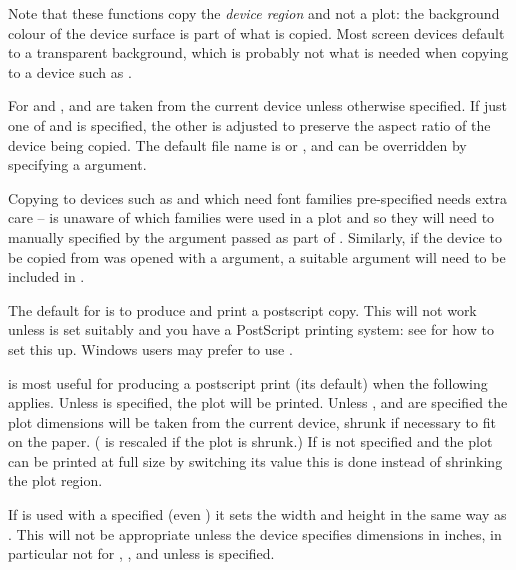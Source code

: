 \begin{Details}\relax
Note that these functions copy the \emph{device region} and not a
plot: the background colour of the device surface is part of what is
copied.  Most screen devices default to a transparent background, which
is probably not what is needed when copying to a device such as
.

For  and ,  and
 are taken from the current device unless otherwise
specified.  If just one of  and  is
specified, the other is adjusted to preserve the aspect ratio of the
device being copied.  The default file name is  or
, and can be overridden by specifying a 
argument.

Copying to devices such as  and
 which need font families pre-specified needs extra
care -- \R{} is unaware of which families were used in a plot and so
they will need to manually specified by the  argument
passed as part of .  Similarly, if the device to be copied
from was opened with a  argument, a suitable
 argument will need to be included in .

The default for  is to produce and print a postscript
copy.  This will not work unless  is
set suitably and you have a PostScript printing system: see
 for how to set this up.  Windows users may
prefer to use .

 is most useful for producing a postscript print
(its default) when the following applies.  Unless
 is specified, the plot will be printed.  Unless
,  and  are specified
the plot dimensions will be taken from the current device, shrunk
if necessary to fit on the paper. ( is rescaled if the
plot is shrunk.)  If  is not specified and the plot
can be printed at full size by switching its value this is done
instead of shrinking the plot region.

If  is used with a specified  (even
) it sets the width and height in the same way as
.  This will not be appropriate unless the device
specifies dimensions in inches, in particular not for
, ,  and  unless
 is specified.
\end{Details}
